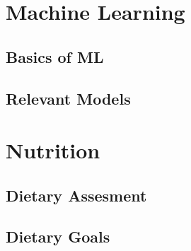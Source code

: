 \section{Machine Learning}
\subsection{Basics of ML}
\subsection{Relevant Models}
\section{Nutrition}
\subsection{Dietary Assesment}
\subsection{Dietary Goals}

